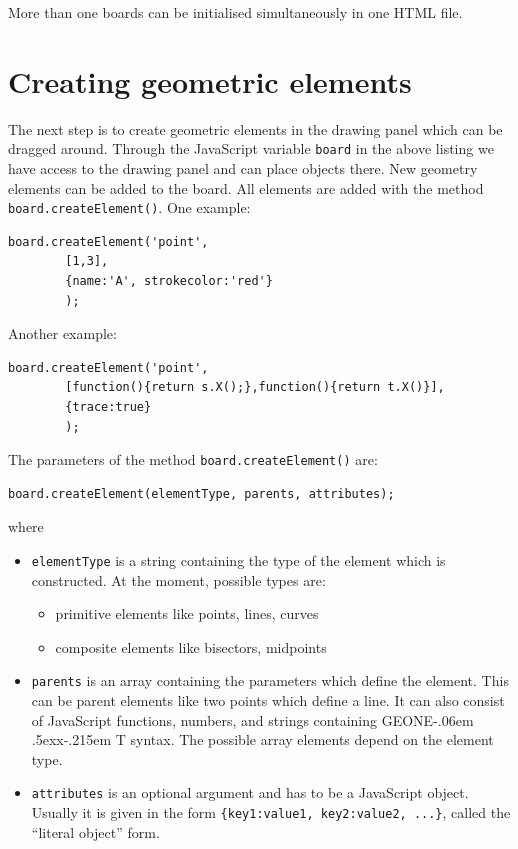 \documentclass[a4paper]{tufte-book}
\def\geonext{GEONE\kern-.06em \lower.5ex\hbox{x}\kern-.215em T}
\begin{document}
More than one boards can be initialised simultaneously in one HTML file. 
\chapter{Creating geometric elements}

The next step is to create geometric elements in the drawing panel which can be 
dragged around.
Through the JavaScript variable \lstinline|board| in the above listing we have access to the drawing panel 
and can place objects there. New geometry elements can be added to the board. 
All elements are added with the method \lstinline|board.createElement()|. One example:
\begin{lstlisting}
board.createElement('point', 
        [1,3], 
        {name:'A', strokecolor:'red'}
        );
\end{lstlisting}
Another example:
\begin{lstlisting}
board.createElement('point', 
        [function(){return s.X();},function(){return t.X()}], 
        {trace:true}
        );
\end{lstlisting}
The parameters of the method \lstinline|board.createElement()| are:
\begin{lstlisting}
board.createElement(elementType, parents, attributes);
\end{lstlisting}
where
\begin{itemize}
    \item \lstinline|elementType| is a string containing the type of the element which is constructed. 
       At the moment, possible types are:
        \begin{itemize}
          \item primitive elements like points, lines, curves
          \item composite elements like bisectors, midpoints 
        \end{itemize}
    \item \lstinline|parents| is an array containing the parameters which define the element. 
    This can be parent elements like two points which define a line. It can also consist of JavaScript functions, numbers, and strings containing \geonext{} syntax. The possible array elements depend on the element type.
    \item \lstinline|attributes| is an optional argument and has to be a JavaScript object. 
    Usually it is given in the form 
    \lstinline|{key1:value1, key2:value2, ...}|, called the ``literal object'' form.
\end{itemize}
\end{document}
